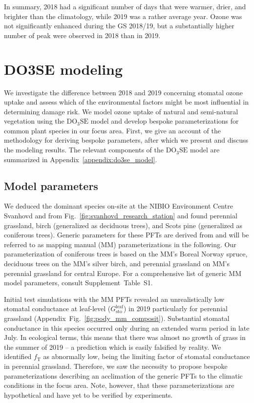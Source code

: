 \documentclass[bg, manuscript]{copernicus}
\begin{document}
In summary, 2018 had a significant number of days that were warmer, drier, and brighter than the climatology, while 2019 was a rather average year. Ozone was not significantly enhanced during the GS 2018/19, but a substantially higher number of peak \chem{[O_3]} were observed in 2018 than in 2019.

\section{DO3SE modeling}
\label{sec:do3se}
We investigate the difference between 2018 and 2019 concerning stomatal ozone uptake and assess which of the environmental factors might be most influential in determining  damage risk. We model ozone uptake of natural and semi-natural vegetation using the $\mathrm{DO_3SE}$ model \citep{ACP:Bueker2012} and develop bespoke parameterizations for common plant species in our focus area. First, we give an account of the methodology for deriving bespoke parameters, after which we present and discuss the modeling results. The relevant components of the $\mathrm{DO_3SE}$ model are summarized in Appendix~\ref{appendix:do3se_model}.

\subsection{Model parameters}
\label{subsec:do3se_parameters}

We deduced the dominant species on-site at the NIBIO Environment Centre Svanhovd and from Fig.~\ref{fig:svanhovd_research_station} and found perennial grassland, birch (generalized as deciduous trees), and Scots pine (generalized as coniferous trees). Generic parameters for these PFTs are derived from \citet{EP:Simpson2007,GCB:Mills2011,ICP:MappingManual2017} and will be referred to as mapping manual (MM) parameterizations in the following. Our parameterization of coniferous trees is based on the MM's Boreal Norway spruce, deciduous trees on the MM's silver birch, and perennial grassland on MM's perennial grassland for central Europe. For a comprehensive list of generic MM model parameters, consult Supplement~Table~S1.

Initial test simulations with the MM PFTs revealed an unrealistically low stomatal conductance at leaf-level ($G_\mathrm{sto}^\mathrm{leaf}$) in 2019 particularly for perennial grassland (Appendix~Fig.~\ref{fig:pody_mm_composit}). Substantial stomatal conductance in this species occurred only during an extended warm period in late July. In ecological terms, this means that there was almost no growth of grass in the summer of 2019 -- a prediction which is easily falsified by reality. We identified $f_\mathrm{T}$ as abnormally low, being the limiting factor of stomatal conductance in perennial grassland. Therefore, we saw the necessity to propose bespoke parameterizations describing an acclimation of the generic PFTs to the climatic conditions in the focus area. Note, however, that these parameterizations are hypothetical and have yet to be verified by experiments. 
\end{document}
